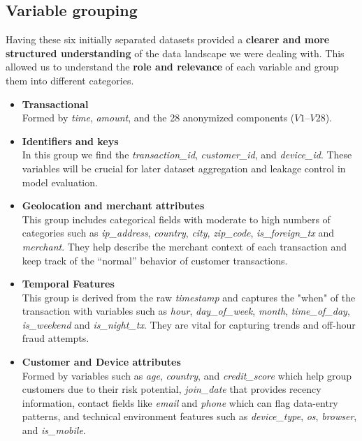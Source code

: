 \documentclass[12pt,a4paper]{report}
\begin{document}
\subsection{Variable grouping}
Having these six initially separated datasets provided a \textbf{clearer and more structured understanding} of the data landscape we were dealing with. This allowed us to understand the \textbf{role and relevance} of each variable and group them into different categories.
\begin{itemize}
    \item \textbf{Transactional} \\
    Formed by \textit{time}, \textit{amount}, and the 28 anonymized components (\(V1\)--\(V28\)).

    \item \textbf{Identifiers and keys} \\
    In this group we find the \textit{transaction\_id}, \textit{customer\_id}, and \textit{device\_id}. 
    These variables will be crucial for later dataset aggregation and leakage control in model evaluation.

    \item \textbf{Geolocation and merchant attributes} \\
    This group includes categorical fields with moderate to high numbers of categories such as 
    \textit{ip\_address}, \textit{country}, \textit{city}, \textit{zip\_code}, \textit{is\_foreign\_tx} and \textit{merchant}. 
    They help describe the merchant context of each transaction and keep track of the “normal” behavior of customer transactions.

    \item \textbf{Temporal Features} \\
    This group is derived from the raw \textit{timestamp} and captures the "when" of the transaction with variables such as
    \textit{hour}, \textit{day\_of\_week}, \textit{month}, \textit{time\_of\_day}, \textit{is\_weekend} and \textit{is\_night\_tx}. 
    They are vital for capturing trends and off-hour fraud attempts.

    \item \textbf{Customer and Device attributes} \\
    Formed by variables such as \textit{age}, \textit{country}, and \textit{credit\_score} which help group customers due to their risk potential, 
    \textit{join\_date} that provides recency information, contact fields like \textit{email} and \textit{phone} which can flag data-entry patterns, and technical environment features such as \textit{device\_type}, \textit{os}, \textit{browser}, and \textit{is\_mobile}.
\end{itemize}
\end{document}
